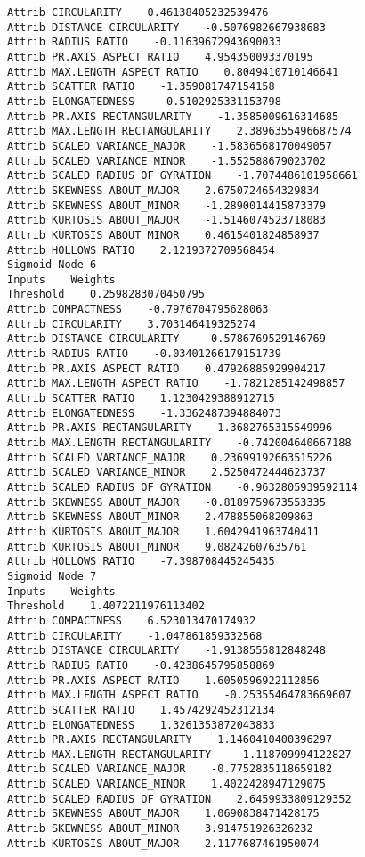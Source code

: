 \documentclass[
	article,			%
	11pt,				%
	oneside,			%
	a4paper,			%
	english,			%
	brazil,				%
	sumario=tradicional
	]{abntex2}
\begin{document}
\begin{lstlisting}
Attrib CIRCULARITY    0.46138405232539476
Attrib DISTANCE CIRCULARITY    -0.5076982667938683
Attrib RADIUS RATIO    -0.11639672943690033
Attrib PR.AXIS ASPECT RATIO    4.954350093370195
Attrib MAX.LENGTH ASPECT RATIO    0.8049410710146641
Attrib SCATTER RATIO    -1.359081747154158
Attrib ELONGATEDNESS    -0.5102925331153798
Attrib PR.AXIS RECTANGULARITY    -1.3585009616314685
Attrib MAX.LENGTH RECTANGULARITY    2.3896355496687574
Attrib SCALED VARIANCE_MAJOR    -1.5836568170049057
Attrib SCALED VARIANCE_MINOR    -1.552588679023702
Attrib SCALED RADIUS OF GYRATION    -1.7074486101958661
Attrib SKEWNESS ABOUT_MAJOR    2.6750724654329834
Attrib SKEWNESS ABOUT_MINOR    -1.2890014415873379
Attrib KURTOSIS ABOUT_MAJOR    -1.5146074523718083
Attrib KURTOSIS ABOUT_MINOR    0.4615401824858937
Attrib HOLLOWS RATIO    2.1219372709568454
Sigmoid Node 6
Inputs    Weights
Threshold    0.2598283070450795
Attrib COMPACTNESS    -0.7976704795628063
Attrib CIRCULARITY    3.703146419325274
Attrib DISTANCE CIRCULARITY    -0.5786769529146769
Attrib RADIUS RATIO    -0.03401266179151739
Attrib PR.AXIS ASPECT RATIO    0.47926885929904217
Attrib MAX.LENGTH ASPECT RATIO    -1.7821285142498857
Attrib SCATTER RATIO    1.1230429388912715
Attrib ELONGATEDNESS    -1.3362487394884073
Attrib PR.AXIS RECTANGULARITY    1.3682765315549996
Attrib MAX.LENGTH RECTANGULARITY    -0.742004640667188
Attrib SCALED VARIANCE_MAJOR    0.23699192663515226
Attrib SCALED VARIANCE_MINOR    2.5250472444623737
Attrib SCALED RADIUS OF GYRATION    -0.9632805939592114
Attrib SKEWNESS ABOUT_MAJOR    -0.8189759673553335
Attrib SKEWNESS ABOUT_MINOR    2.478855068209863
Attrib KURTOSIS ABOUT_MAJOR    1.6042941963740411
Attrib KURTOSIS ABOUT_MINOR    9.08242607635761
Attrib HOLLOWS RATIO    -7.398708445245435
Sigmoid Node 7
Inputs    Weights
Threshold    1.4072211976113402
Attrib COMPACTNESS    6.523013470174932
Attrib CIRCULARITY    -1.047861859332568
Attrib DISTANCE CIRCULARITY    -1.9138555812848248
Attrib RADIUS RATIO    -0.4238645795858869
Attrib PR.AXIS ASPECT RATIO    1.6050596922112856
Attrib MAX.LENGTH ASPECT RATIO    -0.25355464783669607
Attrib SCATTER RATIO    1.4574292452312134
Attrib ELONGATEDNESS    1.3261353872043833
Attrib PR.AXIS RECTANGULARITY    1.1460410400396297
Attrib MAX.LENGTH RECTANGULARITY    -1.118709994122827
Attrib SCALED VARIANCE_MAJOR    -0.7752835118659182
Attrib SCALED VARIANCE_MINOR    1.4022428947129075
Attrib SCALED RADIUS OF GYRATION    2.6459933809129352
Attrib SKEWNESS ABOUT_MAJOR    1.0690838471428175
Attrib SKEWNESS ABOUT_MINOR    3.914751926326232
Attrib KURTOSIS ABOUT_MAJOR    2.1177687461950074

\end{lstlisting}
\end{document}
